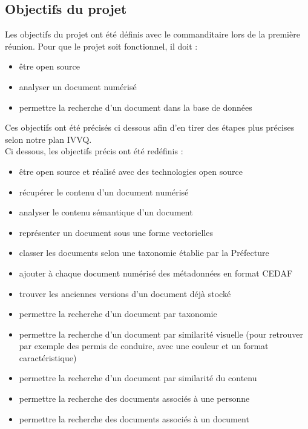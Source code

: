 

\subsection {Objectifs du projet}

Les objectifs du projet ont été définis avec le commanditaire lors de la première réunion.
Pour que le projet soit fonctionnel, il doit :
\begin {itemize}
\item être open source
\item analyser un document numérisé
\item permettre la recherche d'un document dans la base de données
\newline
\end {itemize}
Ces objectifs ont été précisés ci dessous afin d'en tirer des étapes plus précises selon notre plan IVVQ. \\ 

Ci dessous, les objectifs précis ont été redéfinis :
\begin {itemize}
\item être open source et réalisé avec des technologies open source
\item récupérer le contenu d'un document numérisé
\item analyser le contenu sémantique d’un document
\item représenter un document sous une forme vectorielles
\item classer les documents selon une taxonomie établie par la Préfecture
\item ajouter à chaque document numérisé des métadonnées en format CEDAF
\item trouver les anciennes versions d’un document déjà stocké
\item permettre la recherche d’un document par taxonomie
\item permettre la recherche d’un document par similarité visuelle (pour retrouver par exemple des permis de conduire, avec une couleur et un format caractéristique)
\item permettre la recherche d’un document par similarité du contenu
\item permettre la recherche des documents associés à une personne
\item permettre la recherche des documents associés à un document
\\
\end {itemize}


